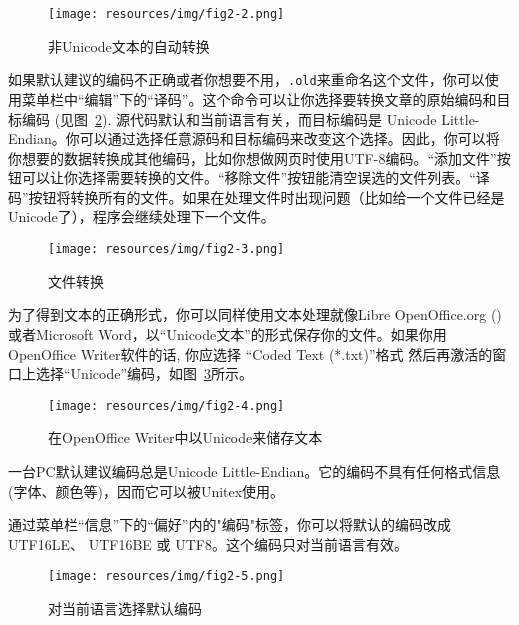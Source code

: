\begin{figure}[!h]
\begin{center}
\texttt{[image: resources/img/fig2-2.png]}
\caption{\label{auto-transcoding}非Unicode文本的自动转换}
\end{center}
\end{figure}

\bigskip
\noindent 如果默认建议的编码不正确或者你想要不用，\verb$.old$来重命名这个文件，你可以使用菜单栏中“编辑”下的“译码”。这个命令可以让你选择要转换文章的原始编码和目标编码 (见图~\ref{transcoding}). 源代码默认和当前语言有关，而目标编码是
Unicode Little-Endian。你可以通过选择任意源码和目标编码来改变这个选择。因此，你可以将你想要的数据转换成其他编码，比如你想做网页时使用UTF-8编码。“添加文件”按钮可以让你选择需要转换的文件。“移除文件”按钮能清空误选的文件列表。“译码”按钮将转换所有的文件。如果在处理文件时出现问题（比如给一个文件已经是Unicode了），程序会继续处理下一个文件。


\begin{figure}[!h]
\begin{center}
\texttt{[image: resources/img/fig2-3.png]}
\caption{\label{transcoding}文件转换}
\end{center}
\end{figure}

\noindent 为了得到文本的正确形式，你可以同样使用文本处理就像Libre OpenOffice.org (\cite{OpenOffice}) 或者Microsoft Word，以“Unicode文本”的形式保存你的文件。如果你用OpenOffice Writer软件的话, 你应选择
“Coded Text (*.txt)”格式 然后再激活的窗口上选择“Unicode”编码，如图~\ref{OfficeWriter}所示。

\begin{figure}[!h]
\begin{center}
\texttt{[image: resources/img/fig2-4.png]}
\caption{\label{OfficeWriter}在OpenOffice Writer中以Unicode来储存文本}
\end{center}
\end{figure}

\noindent 一台PC默认建议编码总是Unicode Little-Endian。它的编码不具有任何格式信息 (字体、颜色等)，因而它可以被Unitex使用。

\bigskip
\noindent 
通过菜单栏“信息”下的“偏好”内的"编码"标签，你可以将默认的编码改成 UTF16LE、 UTF16BE 或 UTF8。这个编码只对当前语言有效。

\begin{figure}[!h]
\begin{center}
\texttt{[image: resources/img/fig2-5.png]}
\caption{对当前语言选择默认编码}
\end{center}
\end{figure}

